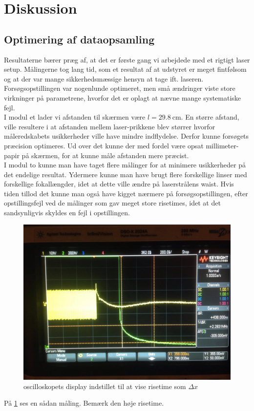 \documentclass[main]{subfiles}
\begin{document}
\section{Diskussion}
\subsection{Optimering af dataopsamling}
Resultaterne bærer præg af, at det er første gang vi arbejdede med et rigtigt laser setup. Målingerne tog lang tid, som et resultat af at udstyret er meget fintfølsom og at der var mange sikkerhedsmæssige hensyn at tage ift. laseren. Forsøgsopstillingen var nogenlunde optimeret, men små ændringer viste store virkninger på parametrene, hvorfor det er oplagt at nævne mange systematiske fejl.
\\
I modul et lader vi afstanden til skærmen være $l = \SI{29,8}{\centi\meter}$. En større afstand, ville resultere i at afstanden mellem laser-prikkene blev størrer hvorfor måleredskabets usikkerheder ville have mindre indflydelse. Derfor kunne forsøgets præcision optimeres. Ud over det kunne der med fordel være opsat millimeter-papir på skærmen, for at kunne måle afstanden mere præcist.
\\
I modul to kunne man have taget flere målinger for at minimere usikkerheder på det endelige resultat. Ydermere kunne man have brugt flere forskellige linser med forskellige fokallængder, idet at dette ville ændre på laserstrålens waist.
Hvis tiden tillod det kunne man også have kigget nærmere på forsøgsopstillingen, efter opstillingsfejl ved de målinger som gav meget store risetimes, idet at det sandsynligvis skyldes en fejl i opstillingen.
\begin{figure}
  \includegraphics[width=\linewidth]{tegninger/BILAG.png}
  \caption{oscilloskopets display indstillet til at vise risetime som $\Delta x$}
  \label{BILAG}
\end{figure}
På \cref{BILAG} ses en sådan måling. Bemærk den høje risetime.
\end{document}
